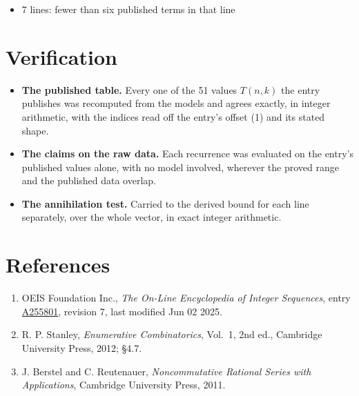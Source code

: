 \documentclass[11pt]{article}
\theoremstyle{definition}
\begin{document}
\begin{itemize}

\item 7 lines: fewer than six published terms in that line

\end{itemize}

\section{Verification}

\begin{itemize}

\item {\bfseries The published table.} Every one of the 51 values $T(n,k)$ the entry publishes was recomputed from the models and agrees exactly, in integer arithmetic, with the indices read off the entry's offset (1) and its stated shape.

\item {\bfseries The claims on the raw data.} Each recurrence was evaluated on the entry's published values alone, with no model involved, wherever the proved range and the published data overlap.

\item {\bfseries The annihilation test.} Carried to the derived bound for each line separately, over the whole vector, in exact integer arithmetic.

\end{itemize}

\section{References}

\begin{enumerate}

\item OEIS Foundation Inc., \emph{The On-Line Encyclopedia of Integer Sequences}, entry \href{https://oeis.org/A255801}{A255801}, revision 7, last modified Jun 02 2025.

\item R. P. Stanley, \emph{Enumerative Combinatorics}, Vol.~1, 2nd ed., Cambridge University Press, 2012; \S4.7.

\item J. Berstel and C. Reutenauer, \emph{Noncommutative Rational Series with Applications}, Cambridge University Press, 2011.

\end{enumerate}
\end{document}
